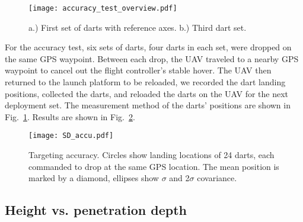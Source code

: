 

\begin{figure} \centering
  {\texttt{[image: accuracy\_test\_overview.pdf]}}
 \caption{a.) First set of darts with reference axes. b.) Third dart set. } 
 \label{fig:Accu_test_darts}
\end{figure}

For the accuracy test, six sets of darts, four darts in each set, were dropped on the same GPS waypoint. Between each drop, the UAV traveled to a nearby GPS waypoint to cancel out the flight controller's stable hover.
The UAV then returned to the launch platform to be reloaded, we recorded the dart landing positions, collected the darts, and reloaded the darts on the UAV for the next deployment set.
The measurement method of the darts' positions are shown in Fig.~\ref{fig:Accu_test_darts}.
Results are shown in Fig.~\ref{fig:SD_accu.pdf}.
  





\begin{figure} \centering
  {\texttt{[image: SD\_accu.pdf]}}
 \caption{Targeting accuracy.  Circles show landing locations of 24 darts, each commanded to drop at the same GPS location. The mean position is marked by a diamond, ellipses show  $\sigma$ and 2$\sigma$ covariance.
 \label{fig:SD_accu.pdf}}
\end{figure}


\subsection{Height vs. penetration depth}


